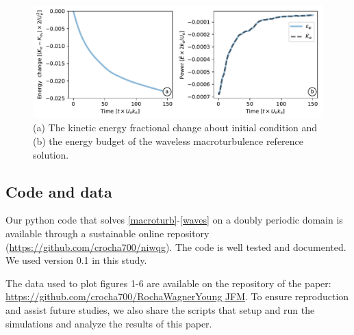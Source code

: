 \documentclass{jfm}
\begin{document}
\begin{figure}
\label{figc2}
\centering
\includegraphics[width=1.\textwidth]{figs/figc2.pdf}
\caption{(a) The kinetic energy fractional change about initial condition and
         (b) the energy budget of the waveless macroturbulence reference solution.}
\end{figure}

\subsection{Code and data}
Our python code that solves \eqref{macroturb}-\eqref{waves} on a doubly periodic domain
is available through a sustainable online repository
(\href{https://github.com/crocha700/niwqg}{https://github.com/crocha700/niwqg}).
The code is well tested and documented. We used version 0.1 in this study.

The data used to plot figures 1-6 are available on the repository of the paper:
\href{https://github.com/crocha700/RochaWagnerYoung_JFM}{https://github.com/crocha700/RochaWagnerYoung$\_$JFM}.
To ensure  reproduction and assist future studies, we also share the scripts that
setup and run the simulations and analyze the results of this paper.



\end{document}
